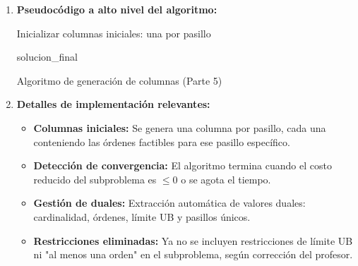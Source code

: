 \documentclass[a4paper,12pt]{article}
\begin{document}
\begin{enumerate}[label=(\alph*), leftmargin=2em]
    \item \textbf{Pseudocódigo a alto nivel del algoritmo:}

    \begin{algorithm}[H]
    
    Inicializar columnas iniciales: una por pasillo\;
    
    \Return solucion\_final\;
    
    \caption{Algoritmo de generación de columnas (Parte 5)}
    \end{algorithm}

    \item \textbf{Detalles de implementación relevantes:}
    
    \begin{itemize}
        \item \textbf{Columnas iniciales:} Se genera una columna por pasillo, cada una conteniendo las órdenes factibles para ese pasillo específico.
        \item \textbf{Detección de convergencia:} El algoritmo termina cuando el costo reducido del subproblema es $\leq 0$ o se agota el tiempo.
        \item \textbf{Gestión de duales:} Extracción automática de valores duales: cardinalidad, órdenes, límite UB y pasillos únicos.
        \item \textbf{Restricciones eliminadas:} Ya no se incluyen restricciones de límite UB ni "al menos una orden" en el subproblema, según corrección del profesor.
    \end{itemize}

\end{enumerate}
\end{document}
